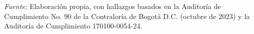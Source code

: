     \vspace{1em}
    \begin{flushleft}
        \textit{Fuente:} Elaboración propia, con hallazgos basados en la Auditoría de Cumplimiento No. 90 de la Contraloría de Bogotá D.C. (octubre de 2023) y la Auditoría de Cumplimiento 170100-0054-24.
    \end{flushleft}
    \label{tab:comparacion_modelos}

